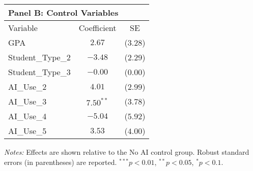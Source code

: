 \begin{table}[!htbp]
\begin{tabular}{lcc}
\multicolumn{3}{l}{\textbf{Panel B: Control Variables}} \\
\hline\hline
Variable & Coefficient & SE \\
\hline
GPA & $2.67$ & ($3.28$) \\
Student_Type_2 & $-3.48$ & ($2.29$) \\
Student_Type_3 & $-0.00$ & ($0.00$) \\
AI_Use_2 & $4.01$ & ($2.99$) \\
AI_Use_3 & $7.50^{**}$ & ($3.78$) \\
AI_Use_4 & $-5.04$ & ($5.92$) \\
AI_Use_5 & $3.53$ & ($4.00$) \\
\hline
\end{tabular}
\begin{tablenotes}
\small
\item \textit{Notes:} Effects are shown relative to the No AI control group. Robust standard errors (in parentheses) are reported. $^{***}p<0.01$, $^{**}p<0.05$, $^{*}p<0.1$.
\end{tablenotes}
\end{table}